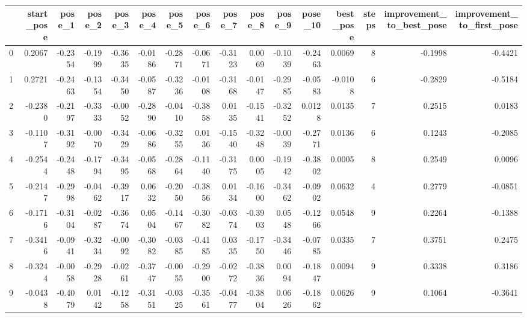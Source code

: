 \begin{tabular}{lrrrrrrrrrrrrrrr}
\toprule
{} &  start\_pose &  pose\_1 &  pose\_2 &  pose\_3 &  pose\_4 &  pose\_5 &  pose\_6 &  pose\_7 &  pose\_8 &  pose\_9 &  pose\_10 &  best\_pose &  steps &  improvement\_to\_best\_pose &  improvement\_to\_first\_pose \\
\midrule
0   &      0.2067 & -0.2354 & -0.1999 & -0.3635 & -0.0186 & -0.2871 & -0.0671 & -0.3123 &  0.0069 & -0.1039 &  -0.2463 &     0.0069 &      8 &                   -0.1998 &                    -0.4421 \\
1   &      0.2721 & -0.2463 & -0.1354 & -0.3450 & -0.0587 & -0.3236 & -0.0108 & -0.3168 & -0.0147 & -0.2985 &  -0.0583 &    -0.0108 &      6 &                   -0.2829 &                    -0.5184 \\
2   &     -0.2380 & -0.2197 & -0.3333 & -0.0052 & -0.2890 & -0.0410 & -0.3858 &  0.0135 & -0.1541 & -0.3252 &   0.0128 &     0.0135 &      7 &                    0.2515 &                     0.0183 \\
3   &     -0.1107 & -0.3192 & -0.0070 & -0.3429 & -0.0686 & -0.3255 &  0.0136 & -0.1540 & -0.3248 & -0.0039 &  -0.2771 &     0.0136 &      6 &                    0.1243 &                    -0.2085 \\
4   &     -0.2544 & -0.2448 & -0.1794 & -0.3495 & -0.0568 & -0.2864 & -0.1140 & -0.3175 &  0.0005 & -0.1942 &  -0.3802 &     0.0005 &      8 &                    0.2549 &                     0.0096 \\
5   &     -0.2147 & -0.2998 & -0.0462 & -0.3917 &  0.0632 & -0.2050 & -0.3856 &  0.0134 & -0.1600 & -0.3462 &  -0.0902 &     0.0632 &      4 &                    0.2779 &                    -0.0851 \\
6   &     -0.1716 & -0.3104 & -0.0287 & -0.3674 &  0.0504 & -0.1467 & -0.3082 & -0.0374 & -0.3903 &  0.0548 &  -0.1266 &     0.0548 &      9 &                    0.2264 &                    -0.1388 \\
7   &     -0.3416 & -0.0941 & -0.3234 & -0.0092 & -0.3082 & -0.0385 & -0.4185 &  0.0335 & -0.1750 & -0.3446 &  -0.0785 &     0.0335 &      7 &                    0.3751 &                     0.2475 \\
8   &     -0.3244 & -0.0058 & -0.2928 & -0.0261 & -0.3747 & -0.0055 & -0.2900 & -0.0272 & -0.3836 &  0.0094 &  -0.1847 &     0.0094 &      9 &                    0.3338 &                     0.3186 \\
9   &     -0.0438 & -0.4079 &  0.0142 & -0.1258 & -0.3151 & -0.0325 & -0.3561 & -0.0477 & -0.3804 &  0.0626 &  -0.1862 &     0.0626 &      9 &                    0.1064 &                    -0.3641 \\

\end{tabular}
